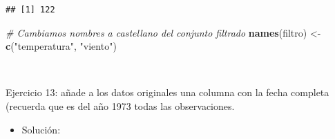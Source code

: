 \documentclass[11pt,]{book}
\newenvironment{Shaded}{\begin{snugshade}}{\end{snugshade}}
\newcommand{\CommentTok}[1]{\textcolor[rgb]{0.37,0.37,0.37}{\textit{#1}}}
\newcommand{\DataTypeTok}[1]{\textcolor[rgb]{0.27,0.27,0.27}{#1}}
\newcommand{\KeywordTok}[1]{\textcolor[rgb]{0.27,0.27,0.27}{\textbf{#1}}}
\newcommand{\NormalTok}[1]{#1}
\newcommand{\OperatorTok}[1]{\textcolor[rgb]{0.43,0.43,0.43}{\textbf{#1}}}
\newcommand{\StringTok}[1]{\textcolor[rgb]{0.5,0.5,0.5}{#1}}
\providecommand{\tightlist}{%
  \setlength{\itemsep}{0pt}\setlength{\parskip}{0pt}}
\begin{document}
\begin{verbatim}
## [1] 122
\end{verbatim}

\begin{Shaded}
\begin{Highlighting}[]
\CommentTok{# Cambiamos nombres a castellano del conjunto filtrado}
\KeywordTok{names}\NormalTok{(filtro) <-}\StringTok{ }\KeywordTok{c}\NormalTok{(}\StringTok{"temperatura"}\NormalTok{, }\StringTok{"viento"}\NormalTok{)}
\end{Highlighting}
\end{Shaded}

~

Ejercicio 13: añade a los datos originales una columna con la fecha completa (recuerda que es del año 1973 todas las observaciones.

\begin{itemize}
\tightlist
\item
  Solución:
\end{itemize}

\begin{Shaded}
\end{Shaded}
\end{document}
